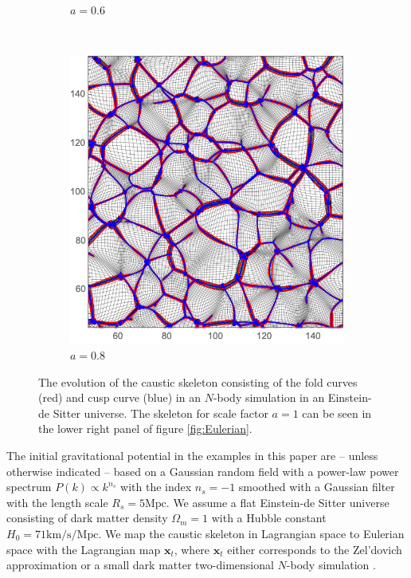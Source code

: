 \documentclass[a4paper, 11pt]{article}
\begin{document}
\begin{figure}
\begin{subfigure}[b]{0.49\textwidth}
\caption{$a=0.6$}
\end{subfigure}~
\begin{subfigure}[b]{0.49\textwidth}
\includegraphics[width=\textwidth]{Evolution_080}
\caption{$a=0.8$}
\end{subfigure}
\caption{The evolution of the caustic skeleton consisting of the fold
curves (red) and cusp curve (blue) in an $N$-body simulation in an
Einstein-de Sitter universe. The skeleton for scale factor $a=1$ can be
seen in the lower right panel of figure
\ref{fig:Eulerian}.}\label{fig:Eulerian_Evolution}
\end{figure}

\begin{framed}
The initial gravitational potential in the examples in this paper are --
unless otherwise indicated -- based on a Gaussian random field with a
power-law power spectrum $P(k) \propto k^{n_s}$ with the index $n_s=-1$
smoothed with a Gaussian filter with the length scale $R_s = 5\text{
Mpc}$. We assume a flat Einstein-de Sitter universe consisting of dark
matter density $\Omega_m=1$ with a Hubble constant $H_0=71\text{
km/s/Mpc}$. We map the caustic skeleton in Lagrangian space to Eulerian
space with the Lagrangian map $\bm{x}_t$, where $\bm{x}_t$ either
corresponds to the Zel'dovich approximation or a small dark matter
two-dimensional $N$-body simulation \cite{Hidding:2020}.
\end{framed}
\end{document}
